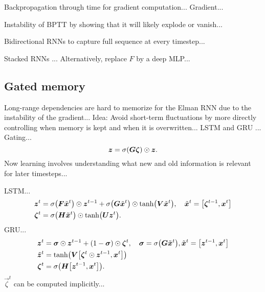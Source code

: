 Backpropagation through time \citep{werbos1990backpropagation} for gradient computation...
Gradient...

Instability of BPTT by showing that it will likely explode or vanish...

Bidirectional RNNs \citep{schuster1997bidirectional} to capture full sequence at every timestep...

Stacked RNNs \citep{joulin2015inferring}... Alternatively, replace $F$ by a deep MLP...

\subsection{Gated memory}

Long-range dependencies are hard to memorize for the Elman RNN due to the instability of the
gradient... Idea: Avoid short-term fluctuations by more directly controlling when memory is kept
and when it is overwritten... LSTM \citep{schmidhuber1997long} and GRU \citep{cho2014learning}...
Gating... \[
    \bm{z} = \sigma(\bm{G} \bm{\zeta}) \odot \bm{z}.
\]
Now learning involves understanding what new and old information is relevant for later timesteps...

LSTM...
\begin{align*}
    \vec{z}^t     & = \sigma \lft( \mat{F} \tilde{\vec{x}}^t \rgt) \odot \vec{z}^{t-1} + \sigma \lft( \mat{G} \tilde{\vec{x}}^t \rgt) \odot \tanh \lft( \mat{V}\tilde{\vec{x}}^t \rgt), \quad \tilde{\vec{x}}^t = \lft[ \vec{\zeta}^{t-1}, \vec{x}^t \rgt] \\
    \vec{\zeta}^t & = \sigma \lft( \mat{H} \tilde{\vec{x}}^t \rgt) \odot \tanh \lft( \mat{U} \vec{z}^t \rgt).
\end{align*}
GRU...
\begin{align*}
    \vec{z}^t         & = \vec{\sigma} \odot \vec{z}^{t-1} + (1 - \vec{\sigma}) \odot \vec{\zeta}^t, \quad \vec{\sigma} = \sigma \lft( \mat{G} \tilde{\vec{x}}^t \rgt), \tilde{\vec{x}}^t = \lft[ \vec{z}^{t-1}, \vec{x}^t \rgt] \\
    \tilde{\vec{z}}^t & = \tanh \lft( \mat{V} \lft[ \vec{\zeta}^t \odot \vec{z}^{t-1}, \vec{x}^t \rgt] \rgt)                                                                                                                     \\
    \vec{\zeta}^t     & = \sigma \lft( \mat{H} \lft[ \vec{z}^{t-1}, \vec{x}^t \rgt] \rgt).
\end{align*}
$\vec{\zeta}^t$ can be computed implicitly...

